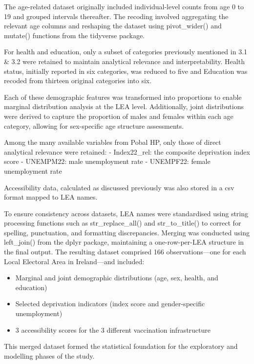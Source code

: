 \documentclass{article}
\providecommand{\tightlist}{%
  \setlength{\itemsep}{0pt}\setlength{\parskip}{0pt}}
\begin{document}
The age-related dataset originally included individual-level counts from
age 0 to 19 and grouped intervals thereafter. The recoding involved
aggregating the relevant age columns and reshaping the dataset using
pivot\_wider() and mutate() functions from the tidyverse package.

For health and education, only a subset of categories previously
mentioned in 3.1 \& 3.2 were retained to maintain analytical relevance
and interpretability. Health status, initially reported in six
categories, was reduced to five and Education was recoded from thirteen
original categories into six.

Each of these demographic features was transformed into proportions to
enable marginal distribution analysis at the LEA level. Additionally,
joint distributions were derived to capture the proportion of males and
females within each age category, allowing for sex-specific age
structure assessments.

Among the many available variables from Pobal HP, only those of direct
analytical relevance were retained: - Index22\_rel: the composite
deprivation index score - UNEMPM22: male unemployment rate - UNEMPF22:
female unemployment rate

Accessibility data, calculated as discussed previously was also stored
in a csv format mapped to LEA names.

To ensure consistency across datasets, LEA names were standardised using
string processing functions such as str\_replace\_all() and
str\_to\_title() to correct for spelling, punctuation, and formatting
discrepancies. Merging was conducted using left\_join() from the dplyr
package, maintaining a one-row-per-LEA structure in the final output.
The resulting dataset comprised 166 observations---one for each Local
Electoral Area in Ireland---and included:

\begin{itemize}
\tightlist
\item
  Marginal and joint demographic distributions (age, sex, health, and
  education)
\item
  Selected deprivation indicators (index score and gender-specific
  unemployment)
\item
  3 accessibility scores for the 3 different vaccination infrastructure
\end{itemize}

This merged dataset formed the statistical foundation for the
exploratory and modelling phases of the study.
\end{document}
